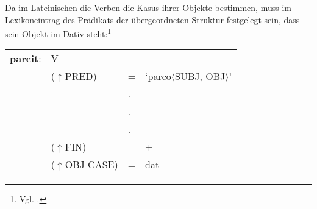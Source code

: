 \documentclass[12pt,a4paper]{article}
\begin{document}
Da im Lateinischen die Verben die Kasus ihrer Objekte bestimmen, muss im Lexikoneintrag des Prädikats der übergeordneten Struktur festgelegt sein, dass sein Objekt im Dativ steht:\footnote{Vgl. \cite[48]{Skript}.} \\
\begin{singlespace}
\begin{tabular}{ l  l  l  l  } 
\textbf{parcit}: & \: V \\
$\qquad$ & \:  ($\uparrow$PRED) & = & `parco$\langle$SUBJ, OBJ$\rangle$' \\
$\qquad$ & $\qquad$ & . \\
$\qquad$ & $\qquad$ & . \\
$\qquad$ & $\qquad$ & . \\
$\qquad$ & \:  ($\uparrow$FIN) & = & + \\
$\qquad$ & \:  ($\uparrow$OBJ CASE) & = & dat \\
\end{tabular}
\newline
\end{singlespace}

\end{document}
